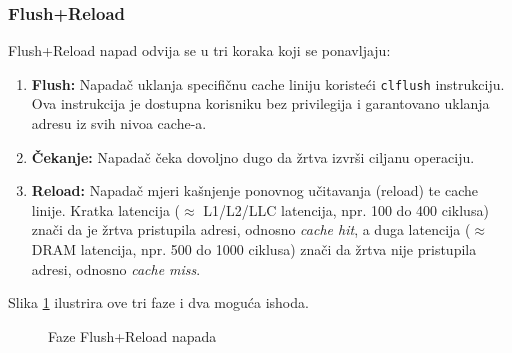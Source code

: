 \subsubsection{Flush+Reload}

Flush+Reload napad \cite{yarom2014} odvija se u tri koraka koji se ponavljaju:

\begin{enumerate}
\item \textbf{Flush:} Napadač uklanja specifičnu cache liniju koristeći \texttt{clflush} instrukciju. Ova instrukcija je dostupna korisniku bez privilegija i garantovano uklanja adresu iz svih nivoa cache-a.
\item \textbf{Čekanje:} Napadač čeka dovoljno dugo da žrtva izvrši ciljanu operaciju.
\item \textbf{Reload:} Napadač mjeri kašnjenje ponovnog učitavanja (reload) te cache linije. Kratka latencija ($\approx$ L1/L2/LLC latencija, npr. 100 do 400 ciklusa) znači da je žrtva pristupila adresi, odnosno \textit{cache hit}, a duga latencija ($\approx$ DRAM latencija, npr. 500 do 1000 ciklusa) znači da žrtva nije pristupila adresi, odnosno \textit{cache miss}.
\end{enumerate}

\noindent Slika \ref{fig:flush_reload_phases} ilustrira ove tri faze i dva moguća ishoda.

\begin{figure}[H]
\centering
{}
\caption{Faze Flush+Reload napada}
\label{fig:flush_reload_phases}
\end{figure}

